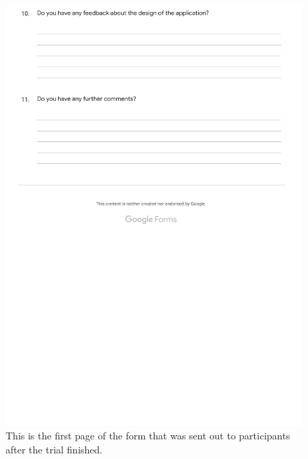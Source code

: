 \documentclass{l4proj}
\begin{document}
\begin{appendices}
\begin{figure}[htb]
    \includegraphics[width=\textwidth]{images/device_form_3.pdf}
    \caption{This is the first page of the form that was sent out to participants after the trial finished.}
    \label{fig:device_form3}
\end{figure}


\end{appendices}
\end{document}
